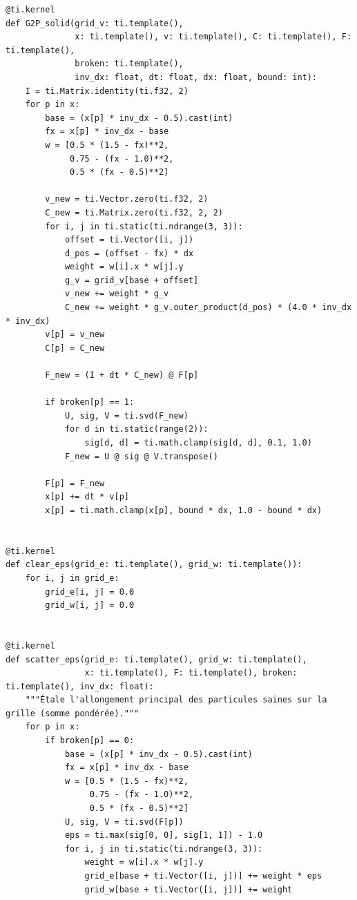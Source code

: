 \documentclass[11pt,a4paper]{article}
\begin{document}
\begin{lstlisting}
@ti.kernel
def G2P_solid(grid_v: ti.template(),
              x: ti.template(), v: ti.template(), C: ti.template(), F: ti.template(),
              broken: ti.template(),
              inv_dx: float, dt: float, dx: float, bound: int):
    I = ti.Matrix.identity(ti.f32, 2)
    for p in x:
        base = (x[p] * inv_dx - 0.5).cast(int)
        fx = x[p] * inv_dx - base
        w = [0.5 * (1.5 - fx)**2,
             0.75 - (fx - 1.0)**2,
             0.5 * (fx - 0.5)**2]

        v_new = ti.Vector.zero(ti.f32, 2)
        C_new = ti.Matrix.zero(ti.f32, 2, 2)
        for i, j in ti.static(ti.ndrange(3, 3)):
            offset = ti.Vector([i, j])
            d_pos = (offset - fx) * dx
            weight = w[i].x * w[j].y
            g_v = grid_v[base + offset]
            v_new += weight * g_v
            C_new += weight * g_v.outer_product(d_pos) * (4.0 * inv_dx * inv_dx)
        v[p] = v_new
        C[p] = C_new

        F_new = (I + dt * C_new) @ F[p]

        if broken[p] == 1:
            U, sig, V = ti.svd(F_new)
            for d in ti.static(range(2)):
                sig[d, d] = ti.math.clamp(sig[d, d], 0.1, 1.0)
            F_new = U @ sig @ V.transpose()

        F[p] = F_new
        x[p] += dt * v[p]
        x[p] = ti.math.clamp(x[p], bound * dx, 1.0 - bound * dx)


@ti.kernel
def clear_eps(grid_e: ti.template(), grid_w: ti.template()):
    for i, j in grid_e:
        grid_e[i, j] = 0.0
        grid_w[i, j] = 0.0


@ti.kernel
def scatter_eps(grid_e: ti.template(), grid_w: ti.template(),
                x: ti.template(), F: ti.template(), broken: ti.template(), inv_dx: float):
    """Étale l'allongement principal des particules saines sur la grille (somme pondérée)."""
    for p in x:
        if broken[p] == 0:
            base = (x[p] * inv_dx - 0.5).cast(int)
            fx = x[p] * inv_dx - base
            w = [0.5 * (1.5 - fx)**2,
                 0.75 - (fx - 1.0)**2,
                 0.5 * (fx - 0.5)**2]
            U, sig, V = ti.svd(F[p])
            eps = ti.max(sig[0, 0], sig[1, 1]) - 1.0
            for i, j in ti.static(ti.ndrange(3, 3)):
                weight = w[i].x * w[j].y
                grid_e[base + ti.Vector([i, j])] += weight * eps
                grid_w[base + ti.Vector([i, j])] += weight



\end{lstlisting}
\end{document}
